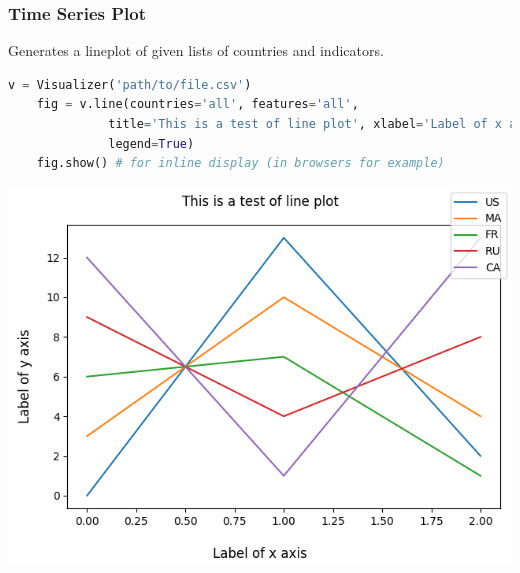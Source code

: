 \begin{frame}[fragile,shrink=30]
  \frametitle{Time Series Plot}
  Generates a lineplot of given lists of countries and indicators.
  \begin{lstlisting}[language=Python]
    v = Visualizer('path/to/file.csv')
    fig = v.line(countries='all', features='all',
              title='This is a test of line plot', xlabel='Label of x axis', ylabel='Label of y axis', 
              legend=True)
    fig.show() # for inline display (in browsers for example)
      \end{lstlisting}
    \begin{center}
    \includegraphics[scale=0.6]{beamer/inc/graphics/line.png}
    \end{center}
\end{frame}

